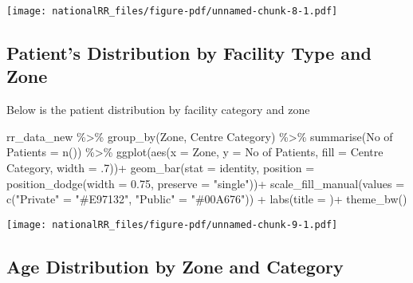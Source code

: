 \documentclass[
  letterpaper,
  DIV=11,
  numbers=noendperiod]{scrartcl}
\newenvironment{Shaded}{\begin{snugshade}}{\end{snugshade}}
\newcommand{\AttributeTok}[1]{\textcolor[rgb]{0.40,0.45,0.13}{#1}}
\newcommand{\DecValTok}[1]{\textcolor[rgb]{0.68,0.00,0.00}{#1}}
\newcommand{\FloatTok}[1]{\textcolor[rgb]{0.68,0.00,0.00}{#1}}
\newcommand{\FunctionTok}[1]{\textcolor[rgb]{0.28,0.35,0.67}{#1}}
\newcommand{\NormalTok}[1]{\textcolor[rgb]{0.00,0.23,0.31}{#1}}
\newcommand{\OtherTok}[1]{\textcolor[rgb]{0.00,0.23,0.31}{#1}}
\newcommand{\SpecialCharTok}[1]{\textcolor[rgb]{0.37,0.37,0.37}{#1}}
\newcommand{\StringTok}[1]{\textcolor[rgb]{0.13,0.47,0.30}{#1}}
\begin{document}
\texttt{[image: nationalRR\_files/figure-pdf/unnamed-chunk-8-1.pdf]}

\subsection{Patient's Distribution by Facility Type and
Zone}\label{patients-distribution-by-facility-type-and-zone}

Below is the patient distribution by facility category and zone

\begin{Shaded}
\begin{Highlighting}[]
\NormalTok{rr\_data\_new }\SpecialCharTok{\%\textgreater{}\%} 
  \FunctionTok{group\_by}\NormalTok{(Zone, }\StringTok{\textasciigrave{}}\AttributeTok{Centre Category}\StringTok{\textasciigrave{}}\NormalTok{) }\SpecialCharTok{\%\textgreater{}\%} 
  \FunctionTok{summarise}\NormalTok{(}\StringTok{\textquotesingle{}No of Patients\textquotesingle{}} \OtherTok{=} \FunctionTok{n}\NormalTok{()) }\SpecialCharTok{\%\textgreater{}\%} 
    \FunctionTok{ggplot}\NormalTok{(}\FunctionTok{aes}\NormalTok{(}\AttributeTok{x =}\NormalTok{ Zone, }\AttributeTok{y =} \StringTok{\textasciigrave{}}\AttributeTok{No of Patients}\StringTok{\textasciigrave{}}\NormalTok{, }\AttributeTok{fill =} \StringTok{\textasciigrave{}}\AttributeTok{Centre Category}\StringTok{\textasciigrave{}}\NormalTok{, }\AttributeTok{width =}\NormalTok{ .}\DecValTok{7}\NormalTok{))}\SpecialCharTok{+}
      \FunctionTok{geom\_bar}\NormalTok{(}\AttributeTok{stat =} \StringTok{\textquotesingle{}identity\textquotesingle{}}\NormalTok{, }\AttributeTok{position =} \FunctionTok{position\_dodge}\NormalTok{(}\AttributeTok{width =} \FloatTok{0.75}\NormalTok{, }\AttributeTok{preserve =} \StringTok{"single"}\NormalTok{))}\SpecialCharTok{+}
      \FunctionTok{scale\_fill\_manual}\NormalTok{(}\AttributeTok{values =} \FunctionTok{c}\NormalTok{(}\StringTok{"Private"} \OtherTok{=} \StringTok{"\#E97132"}\NormalTok{, }\StringTok{"Public"} \OtherTok{=} \StringTok{"\#00A676"}\NormalTok{)) }\SpecialCharTok{+}
      \FunctionTok{labs}\NormalTok{(}\AttributeTok{title =} \StringTok{\textquotesingle{}\textquotesingle{}}\NormalTok{)}\SpecialCharTok{+}
      \FunctionTok{theme\_bw}\NormalTok{()}
\end{Highlighting}
\end{Shaded}

\texttt{[image: nationalRR\_files/figure-pdf/unnamed-chunk-9-1.pdf]}

\subsection{Age Distribution by Zone and
Category}\label{age-distribution-by-zone-and-category}
\end{document}
